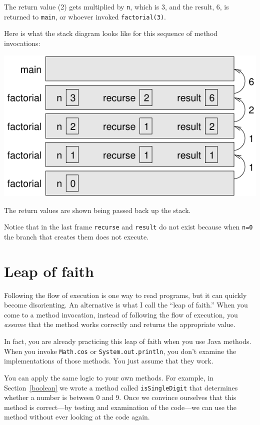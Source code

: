 \documentclass[12pt]{book}
\theoremstyle{exercise}
\begin{document}
\noindent The return value (2) gets multiplied by {\tt n}, which is 3,
and the result, 6, is returned to {\tt main}, or whoever
invoked {\tt factorial(3)}.


Here is what the stack diagram looks like for this sequence of
method invocations:

\includegraphics{figs/stack3.pdf}

The return values are shown being passed back up the stack.

Notice that in the last frame {\tt recurse} and {\tt result} do not
exist because when {\tt n=0} the branch that creates them does not
execute.


\section{Leap of faith}
\label{leap of faith}

Following the flow of execution is one way to read programs, but it can
quickly become disorienting.  An alternative is what I call the ``leap
of faith.''  When you come to a method invocation, instead of
following the flow of execution, you {\em assume} that the method
works correctly and returns the appropriate value.

In fact, you are already practicing this leap of faith
when you use Java methods.  When you invoke {\tt Math.cos}
or {\tt System.out.println}, you don't examine the implementations of
those methods.  You just assume that they work.

You can apply the same logic to your own methods.
For example, in Section~\ref{boolean} we wrote a method called
{\tt isSingleDigit} that determines whether a number is between
0 and 9.  Once we convince ourselves that this method
is correct---by testing and examination of the code---we can
use the method without ever looking at the code again.
\end{document}
